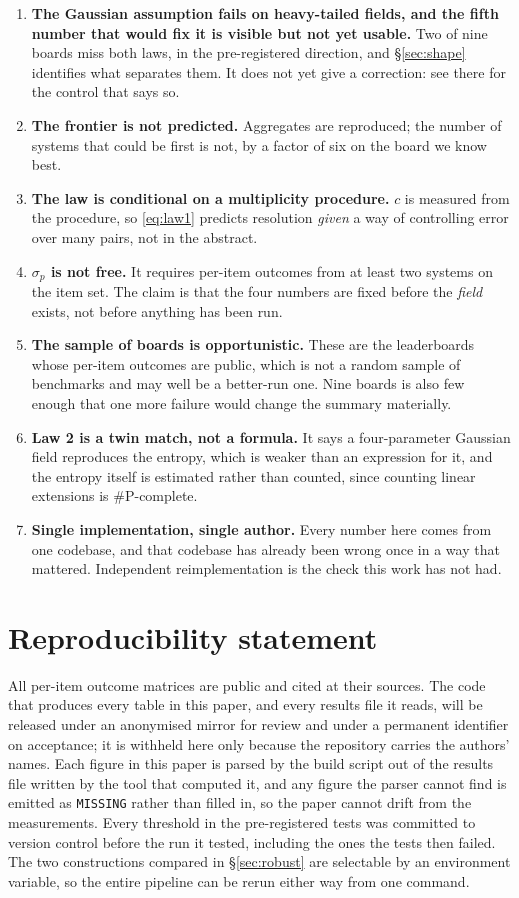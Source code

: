 \documentclass[10pt]{article}
\begin{document}
\begin{enumerate}
\item \textbf{The Gaussian assumption fails on heavy-tailed fields, and the
  fifth number that would fix it is visible but not yet usable.} Two of nine
  boards miss both laws, in the pre-registered direction, and \S\ref{sec:shape}
  identifies what separates them. It does not yet give a correction: see
  there for the control that says so.
\item \textbf{The frontier is not predicted.} Aggregates are reproduced;
  the number of systems that could be first is not, by a factor of six on
  the board we know best.
\item \textbf{The law is conditional on a multiplicity procedure.} $c$ is
  measured from the procedure, so \eqref{eq:law1} predicts resolution
  \emph{given} a way of controlling error over many pairs, not in the
  abstract.
\item \textbf{$\sigma_p$ is not free.} It requires per-item outcomes from at
  least two systems on the item set. The claim is that the four numbers are
  fixed before the \emph{field} exists, not before anything has been run.
\item \textbf{The sample of boards is opportunistic.} These are the
  leaderboards whose per-item outcomes are public, which is not a random
  sample of benchmarks and may well be a better-run one. Nine boards is
  also few enough that one more failure would change the summary
  materially.
\item \textbf{Law 2 is a twin match, not a formula.} It says a
  four-parameter Gaussian field reproduces the entropy, which is weaker
  than an expression for it, and the entropy itself is estimated rather
  than counted, since counting linear extensions is \#P-complete.
\item \textbf{Single implementation, single author.} Every number here comes
  from one codebase, and that codebase has already been wrong once in a way
  that mattered. Independent reimplementation is the check this work has
  not had.
\end{enumerate}

\section*{Reproducibility statement}

All per-item outcome matrices are public and cited at their sources. The
code that produces every table in this paper, and every results file it
reads, will be released under an anonymised mirror for review and under a
permanent identifier on acceptance; it is withheld here only because the
repository carries the authors' names. Each figure in this paper is parsed
by the build script out of the
results file written by the tool that computed it, and any figure the parser
cannot find is emitted as \texttt{MISSING} rather than filled in, so the
paper cannot drift from the measurements. Every threshold in the
pre-registered tests was committed to version control before the run it
tested, including the ones the tests then failed. The two constructions
compared in \S\ref{sec:robust} are selectable by an environment variable, so
the entire pipeline can be rerun either way from one command.
\end{document}
